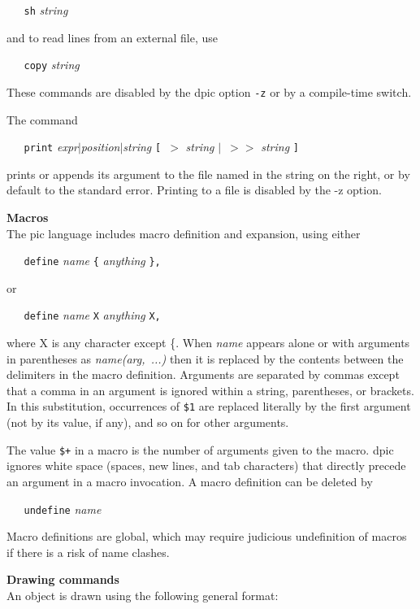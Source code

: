 {\tt \ \ \ sh}
{\it string}

and to read lines from an external file, use

{\tt \ \ \ copy}
{\it string}

These commands are disabled by the
dpic
option
{\tt -z}
or by a compile-time switch.

The command

{\tt \ \ \ print}
{\it expr$|$position$|$string}
{\tt [\ $>$}
{\it string}
{\tt $|$\ $>$$>$}
{\it string}
{\tt ]}

prints or appends its argument to the file named in the string
on the right, or by default to the standard error.
Printing to a file is disabled by the -z option.

\par\hskip-2pc{\bf Macros}\\
The
pic
language includes macro definition and expansion, using either

{\tt \ \ \ define}
{\it name}
{\tt \{}
{\it anything}
{\tt \},}

or

{\tt \ \ \ define}
{\it name}
{\tt X}
{\it anything}
{\tt X,}

where X is any character except \{. When
{\it name}
appears alone or with arguments in parentheses as
{\it name(arg,\ ...)}
then it is replaced by the contents between the delimiters in the macro
definition.
Arguments are separated by commas except that
a comma in an argument is ignored within a string, parentheses, or brackets.
In this substitution, occurrences of
{\tt \$1}
are replaced literally by the first argument (not by its value, if any),
and so on for other arguments.

The value
{\tt \$+}
in a macro is the number of arguments given to the macro.
dpic
ignores white space (spaces, new lines, and tab characters) that directly
precede an argument in a macro invocation.
A macro definition can be deleted by

{\tt \ \ \ undefine}
{\it name}

Macro definitions are global, which may require judicious
undefinition of macros if there is a risk of name clashes.
\par\hskip-2pc{\bf Drawing commands}\\
An object is drawn using the following general format:

